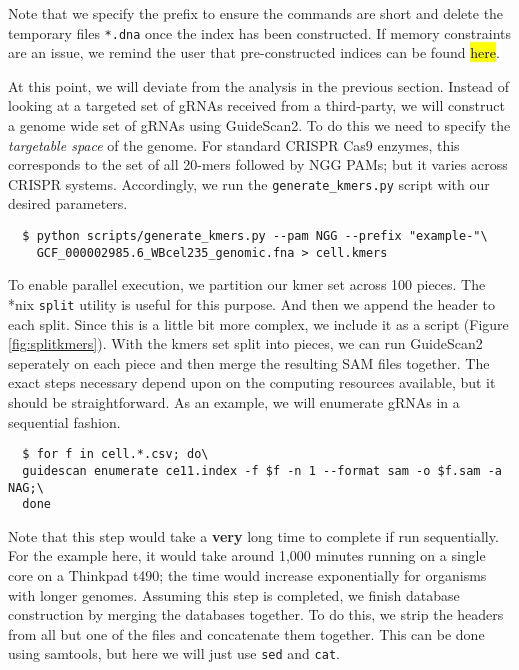 \documentclass[10pt]{article}
\begin{document}
Note that we specify the prefix to ensure the commands are short and
delete the temporary files \texttt{*.dna} once the index has been
constructed. If memory constraints are an issue, we remind the user
that pre-constructed indices can be found \hl{here}.

At this point, we will deviate from the analysis in the previous
section. Instead of looking at a targeted set of gRNAs received from a
third-party, we will construct a genome wide set of gRNAs using
GuideScan2. To do this we need to specify the {\it targetable space}
of the genome. For standard CRISPR Cas9 enzymes, this corresponds to
the set of all 20-mers followed by NGG PAMs; but it varies across
CRISPR systems. Accordingly, we run the \texttt{generate\_kmers.py}
script with our desired parameters.

\begin{verbatim}
  $ python scripts/generate_kmers.py --pam NGG --prefix "example-"\
    GCF_000002985.6_WBcel235_genomic.fna > cell.kmers
\end{verbatim}

To enable parallel execution, we partition our kmer set across 100
pieces. The *nix \texttt{split} utility is useful for this
purpose. And then we append the header to each split. Since this is a
little bit more complex, we include it as a script (Figure
\ref{fig:splitkmers}). With the kmers set split into pieces, we can
run GuideScan2 seperately on each piece and then merge the resulting
SAM files together. The exact steps necessary depend upon on the
computing resources available, but it should be straightforward. As an
example, we will enumerate gRNAs in a sequential fashion.

\begin{verbatim}
  $ for f in cell.*.csv; do\
  guidescan enumerate ce11.index -f $f -n 1 --format sam -o $f.sam -a NAG;\
  done
\end{verbatim}

Note that this step would take a \textbf{very} long time to complete
if run sequentially. For the example here, it would take around 1,000
minutes running on a single core on a Thinkpad t490; the time would
increase exponentially for organisms with longer genomes. Assuming
this step is completed, we finish database construction by merging the
databases together. To do this, we strip the headers from all but one
of the files and concatenate them together. This can be done using
samtools, but here we will just use \texttt{sed} and \texttt{cat}.
\end{document}
